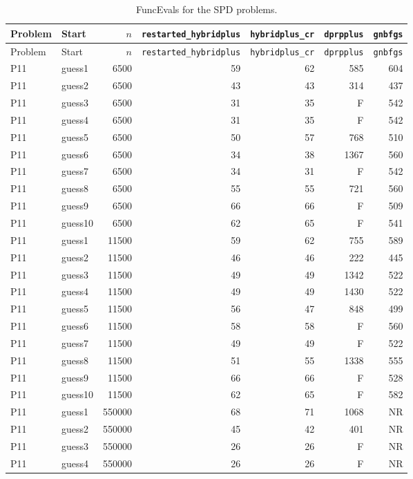 {\footnotesize
\begin{longtable}{llrrrrr}
\caption{FuncEvals for the SPD problems.}\label{tab:spd_function_evaluations}\\
\toprule Problem & Start & $n$ & \texttt{restarted\_hybridplus} & \texttt{hybridplus\_cr} & \texttt{dprpplus} & \texttt{gnbfgs} \\
\midrule
\endfirsthead
\toprule Problem & Start & $n$ & \texttt{restarted\_hybridplus} & \texttt{hybridplus\_cr} & \texttt{dprpplus} & \texttt{gnbfgs} \\
\midrule
\endhead
\bottomrule
\endfoot
P11 & guess1 & 6500 & 59 & 62 & 585 & 604 \\
P11 & guess2 & 6500 & 43 & 43 & 314 & 437 \\
P11 & guess3 & 6500 & 31 & 35 & F & 542 \\
P11 & guess4 & 6500 & 31 & 35 & F & 542 \\
P11 & guess5 & 6500 & 50 & 57 & 768 & 510 \\
P11 & guess6 & 6500 & 34 & 38 & 1367 & 560 \\
P11 & guess7 & 6500 & 34 & 31 & F & 542 \\
P11 & guess8 & 6500 & 55 & 55 & 721 & 560 \\
P11 & guess9 & 6500 & 66 & 66 & F & 509 \\
P11 & guess10 & 6500 & 62 & 65 & F & 541 \\
P11 & guess1 & 11500 & 59 & 62 & 755 & 589 \\
P11 & guess2 & 11500 & 46 & 46 & 222 & 445 \\
P11 & guess3 & 11500 & 49 & 49 & 1342 & 522 \\
P11 & guess4 & 11500 & 49 & 49 & 1430 & 522 \\
P11 & guess5 & 11500 & 56 & 47 & 848 & 499 \\
P11 & guess6 & 11500 & 58 & 58 & F & 560 \\
P11 & guess7 & 11500 & 49 & 49 & F & 522 \\
P11 & guess8 & 11500 & 51 & 55 & 1338 & 555 \\
P11 & guess9 & 11500 & 66 & 66 & F & 528 \\
P11 & guess10 & 11500 & 62 & 65 & F & 582 \\
P11 & guess1 & 550000 & 68 & 71 & 1068 & NR \\
P11 & guess2 & 550000 & 45 & 42 & 401 & NR \\
P11 & guess3 & 550000 & 26 & 26 & F & NR \\
P11 & guess4 & 550000 & 26 & 26 & F & NR \\

\end{longtable}}
